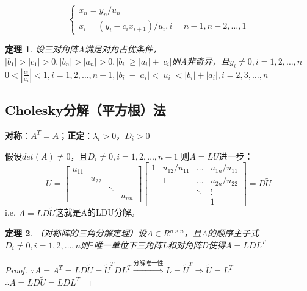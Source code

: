 \documentclass[a4paper]{article}
\newtheorem{theorem}{定理}[section]
\begin{document}
\begin{equation}
  \left\{
    \begin{array}{lr}
      x_n = y_n/u_n \\
      x_i = (y_i-c_ix_{i+1})/u_i, i=n-1,n-2,\dots, 1
    \end{array}
    \right.
    \label{eq:4.10}
\end{equation}

\begin{theorem}
  设三对角阵A满足对角占优条件，$|b_1|>|c_1|>0, |b_n|>|a_n|>0, |b_i|\ge |a_i|+|c_i|$则A非奇异，且$y_i\neq 0, i=1,2,\dots, n$
  $0<|\frac{c_i}{u_i}|<1, i=1,2,\dots, n-1, |b_i|-|a_i|<|u_i|<|b_i|+|a_i|, i=2,3,\dots, n$
\end{theorem}

\subsection{Cholesky分解（平方根）法}
\textbf{对称}：$A^T = A$；\textbf{正定}：$\lambda_i > 0$，$D_i > 0$

假设$det(A)\neq 0$，且$D_i\neq 0, i=1,2,\dots, n-1$
则$A=LU$进一步：
$$U=\left[
  \begin{matrix}
    u_{11} \\
    & u_{22} \\
    & & \ddots \\
    & & & u_{nn}
  \end{matrix}\right]
  \left[
    \begin{matrix}
      1 & u_{12}/u_{11} & \dots & u_{1n}/u_{11} \\
      & 1 & \dots & u_{2n}/u_{22} \\
      & & \ddots & \vdots \\
      & & & 1
    \end{matrix}
    \right]=D\widetilde{U}
  $$
i.e. $A=LD\widetilde{U}$这就是A的LDU分解。

\begin{theorem}
  （对称阵的三角分解定理）设$A\in R^{n\times n}$，且A的顺序主子式$D_i\neq 0, i=1,2,\dots,n$则$\exists$唯一单位下三角阵L和对角阵D使得$A=LDL^T$
\end{theorem}

\begin{proof}
$\because A=A^T=LD\widetilde{U} = \widetilde{U}^TDL^T \stackrel{\text{分解唯一性}}{\Rightarrow} L=\widetilde{U}^T\Rightarrow \widetilde{U}=L^T$ \\
$\therefore A=LD\widetilde{U}=LDL^T$
\end{proof}
\end{document}
